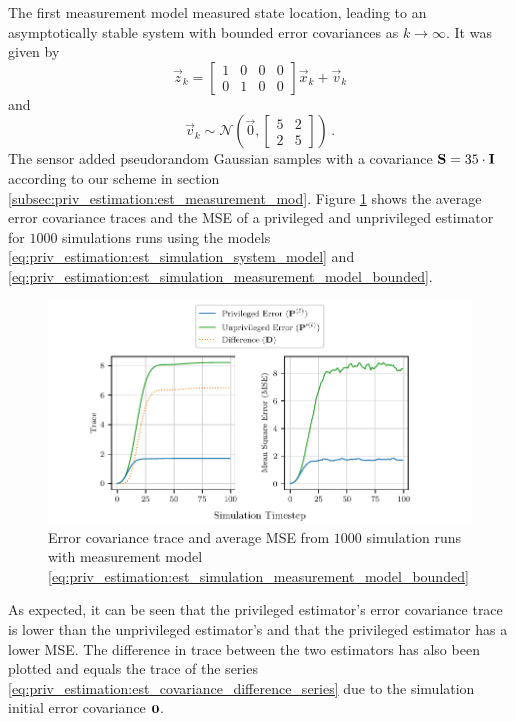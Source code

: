 The first measurement model measured state location, leading to an asymptotically stable system with bounded error covariances as $k \rightarrow \infty$. It was given by 
\begin{equation}\label{eq:priv_estimation:est_simulation_measurement_model_bounded}
    \vec{z}_k=
    \begin{bmatrix}
        1 & 0 & 0 & 0\\
        0 & 1 & 0 & 0
    \end{bmatrix}
    \vec{x}_k + \vec{v}_k
\end{equation}
and
\begin{equation}
    \vec{v}_k \sim \mathcal{N}\left(\vec{0},
    \begin{bmatrix}
        5 & 2\\
        2 & 5
    \end{bmatrix}\right)\,.
\end{equation}
The sensor added pseudorandom Gaussian samples with a covariance ${{\mathbf{S}}}=35 \cdot {\ensuremath{{\mathbf{I}}}}$ according to our scheme in section \ref{subsec:priv_estimation:est_measurement_mod}. Figure \ref{fig:priv_estimation:est_sim_bounded} shows the average error covariance traces and the MSE of a privileged and unprivileged estimator for $1000$ simulations runs using the models \eqref{eq:priv_estimation:est_simulation_system_model} and \eqref{eq:priv_estimation:est_simulation_measurement_model_bounded}. 
\begin{figure}[htbp]
    \centering
    \includegraphics{figures/priv_estimation_est_sim_bounded.pdf}
    \caption{Error covariance trace and average MSE from $1000$ simulation runs with measurement model \eqref{eq:priv_estimation:est_simulation_measurement_model_bounded}}
    \label{fig:priv_estimation:est_sim_bounded}
\end{figure}
As expected, it can be seen that the privileged estimator's error covariance trace is lower than the unprivileged estimator's and that the privileged estimator has a lower MSE. The difference in trace between the two estimators has also been plotted and equals the trace of the series \eqref{eq:priv_estimation:est_covariance_difference_series} due to the simulation initial error covariance ${{\mathbf{0}}}$.

